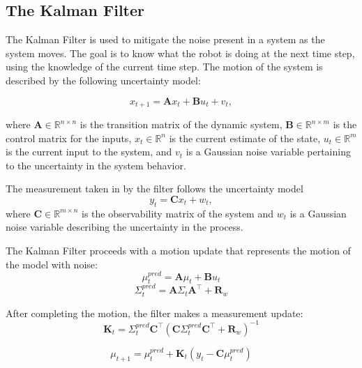 \subsection*{The Kalman Filter}
The Kalman Filter is used to mitigate the noise present in a system as the system moves.
The goal is to know what the robot is doing at the next time step, using the knowledge of the current time step.
The motion of the system is described by the following uncertainty model:

\begin{equation}
  x_{t+1} = \mathbf{A} x_t + \mathbf{B} u_t + v_t,
\end{equation}

where $\mathbf{A}\in\mathbb{R}^{n\times n}$ is the transition matrix of the dynamic system, $\mathbf{B}\in\mathbb{R}^{n\times m}$ is the control matrix for the inputs, $x_{t}\in\mathbb{R}^{n}$ is the current estimate of the state, $u_{t}\in\mathbb{R}^{m}$ is the current input to the system, and $v_t$ is a Gaussian noise variable pertaining to the uncertainty in the system behavior.

The measurement taken in by the filter follows the uncertainty model
\begin{equation}
  y_t = \mathbf{C} x_t + w_t,
\end{equation}
where $\mathbf{C}\in\mathbb{R}^{m\times n}$ is the observability matrix of the system and $w_t$ is a Gaussian noise variable describing the uncertainty in the process.

The Kalman Filter proceeds with a motion update that represents the motion of the model with noise:
\begin{equation}
  \mu_t^{pred} = \mathbf{A} \mu_t + \mathbf{B} u_t
\end{equation}
\begin{equation}
  \Sigma_t^{pred} = \mathbf{A} \Sigma_t \mathbf{A}^\intercal + \mathbf{R}_w
\end{equation}

After completing the motion, the filter makes a measurement update:
\begin{equation}
  \mathbf{K}_t = \Sigma_t^{pred} \mathbf{C}^{\intercal} (\mathbf{C} \Sigma_t^{pred} \mathbf{C}^{\intercal} + \mathbf{R}_w)^{-1}
\end{equation}

\begin{equation}
  \mu_{t+1} = \mu_t^{pred} + \mathbf{K}_{t} (y_t - \mathbf{C} \mu_t^{pred})
\end{equation}

